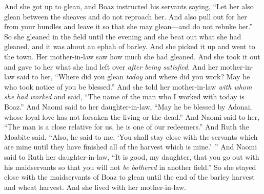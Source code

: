 \begin{biblechapter}
\verse And she got up to glean, and Boaz instructed his servants saying, “Let her also glean between the sheaves and do not reproach her.
\verse And also pull out for her from your bundles and leave it so that she may glean—and do not rebuke her.”
\verse So she gleaned in the field until the evening and she beat out what she had gleaned, and it was about an ephah of barley.
\verse And she picked it up and went to the town. Her mother-in-law saw how much she had gleaned. And she took it out and gave to her what she had left over \textit{after being satisfied}.
\verse And her mother-in-law said to her, “Where did you glean \textit{today} and where did you work? May he who took notice of you be blessed.” And she told her mother-in-law \textit{with whom she had worked} and said, “The name of the man who I worked with today is Boaz.”
\verse And Naomi said to her daughter-in-law, “May he be blessed by Adonai, whose loyal love has not forsaken the living or the dead.” And Naomi said to her, “The man is a close relative for us, he is one of our redeemers.”
\verse And Ruth the Moabite said, “Also, he said to me, ‘You shall stay close with the servants which are mine until they have finished all of the harvest which is mine.’ ”
\verse And Naomi said to Ruth her daughter-in-law, “It is good, my daughter, that you go out with his maidservants so that you will not \textit{be bothered} in another field.”
\verse So she stayed close with the maidservants of Boaz to glean until the end of the barley harvest and wheat harvest. And she lived with her mother-in-law.
\end{biblechapter}

